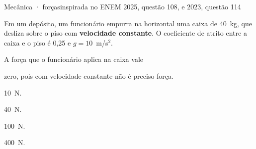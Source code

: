 \begin{treino}{Mecânica · forças\hfill\normalfont\footnotesize inspirada no ENEM 2025, questão 108, e 2023, questão 114}
\begin{minipage}[c]{0.56\linewidth}
Em um depósito, um funcionário empurra na horizontal uma caixa de 40~kg, que desliza sobre o piso com \textbf{velocidade constante}.
O coeficiente de atrito entre a caixa e o piso é 0,25 e $g = 10$~m/s$^2$.

\smallskip A força que o funcionário aplica na caixa vale
\end{minipage}\hfill
\begin{minipage}[c]{0.41\linewidth}\centering
{}
\end{minipage}
\begin{alternativas}
  \item zero, pois com velocidade constante não é preciso força.
  \item 10~N.
  \item 40~N.
  \item 100~N.
  \item 400~N.
\end{alternativas}
\end{treino}

